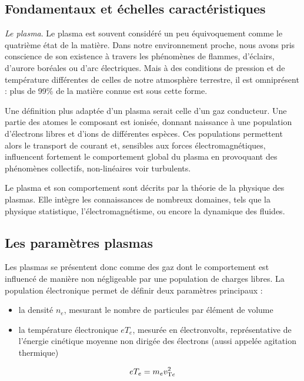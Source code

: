 \label{Introduction}
\begin{refsection}

\section{Fondamentaux et échelles caractéristiques}
\emph{Le plasma}. Le plasma est souvent considéré un peu équivoquement comme le
quatrième état de la matière. Dans notre environnement proche, nous avons pris
conscience de son existence à travers les phénomènes de flammes, d'éclairs,
d'aurore boréales ou d'arc électriques. Mais à des conditions de pression et de
température différentes de celles de notre atmosphère terrestre, il est
omniprésent : plus de 99\% de la matière connue est sous cette forme.

Une définition plus adaptée d'un plasma serait celle d'un gaz conducteur. Une
partie des atomes le composant est ionisée, donnant naissance à une population
d'électrons libres et d'ions de différentes espèces. Ces populations permettent
alors le transport de courant et, sensibles aux forces électromagnétiques,
influencent fortement le comportement global du plasma en provoquant des
phénomènes collectifs, non-linéaires voir turbulents.

Le plasma et son comportement sont décrits par la théorie de la physique des
plasmas. Elle intègre les connaissances de nombreux domaines, tels que la
physique statistique, l'électromagnétisme, ou encore la dynamique des fluides.

\subsection{Les paramètres plasmas}
Les plasmas se présentent donc comme des gaz dont le comportement est influencé
de manière non négligeable par une population de charges libres.
La population électronique permet de définir deux paramètres principaux :

\begin{itemize}
  \item la densité $n_e$, mesurant le nombre
  de particules par élément de volume
  \item la température électronique $eT_e$, mesurée en électronvolts,
  représentative de l'énergie cinétique moyenne non dirigée des électrons (aussi appelée
   agitation thermique)
\end{itemize}

\begin{equation}
	eT_{e}=m_{e} v_{\text{T}{e}}^{{2}}
\end{equation}


\end{refsection}
